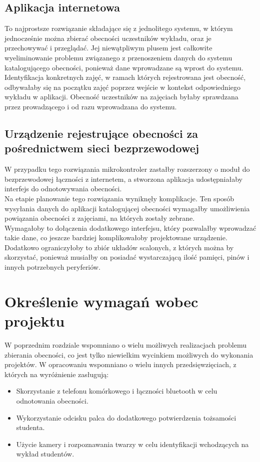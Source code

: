 \documentclass[declaration,shortabstract, mgr]{iithesis}
\begin{document}
\subsection{Aplikacja internetowa}
\indent To najprostsze rozwiązanie składające się z jednolitego systemu, w którym jednocześnie można zbierać obecności uczestników wykładu, oraz je przechowywać i przeglądać. Jej niewątpliwym plusem jest całkowite wyeliminowanie problemu związanego z przenoszeniem danych do systemu katalogującego obecności, ponieważ dane wprowadzane są wprost do systemu. Identyfikacja konkretnych zajęć, w ramach których rejestrowana jest obecność, odbywałaby się na początku zajęć poprzez wejście w kontekst odpowiedniego wykładu w aplikacji. Obecność uczestników na zajęciach byłaby sprawdzana przez prowadzącego i od razu wprowadzana do systemu. \\

\subsection{Urządzenie rejestrujące obecności za pośrednictwem sieci bezprzewodowej}
\indent W przypadku tego rozwiązania mikrokontroler zastałby rozszerzony o moduł do bezprzewodowej łączności z internetem, a stworzona aplikacja udostępniałaby interfejs do odnotowywania obecności. \\
\indent Na etapie planowanie tego rozwiązania wyniknęły komplikacje. Ten sposób wysyłania danych do aplikacji katalogującej obecności wymagałby umożliwienia powiązania obecności z zajęciami, na których zostały zebrane. \\
\indent Wymagałoby to dołączenia dodatkowego interfejsu, który pozwalałby wprowadzać takie dane, co jeszcze bardziej komplikowałoby projektowane urządzenie. Dodatkowo ograniczyłoby to zbiór układów scalonych, z których można by skorzystać, ponieważ musiałby on posiadać wystarczającą ilość pamięci, pinów i innych potrzebnych peryferiów.

\section{Określenie wymagań wobec projektu}
\indent W poprzednim rozdziale wspomniano o wielu możliwych realizacjach problemu zbierania obecności, co jest tylko niewielkim wycinkiem możliwych do wykonania projektów. W opracowaniu \cite{review} wspomniano o wielu innych przedsięwzięciach, z których na wyróżnienie zasługują:

\begin{itemize}
\item Skorzystanie z telefonu komórkowego i łączności bluetooth w celu odnotowania obecności.
\item Wykorzystanie odcisku palca do dodatkowego potwierdzenia tożsamości studenta.
\item Użycie kamery i rozpoznawania twarzy w celu identyfikacji wchodzących na wykład studentów.
\end{itemize}
\end{document}
